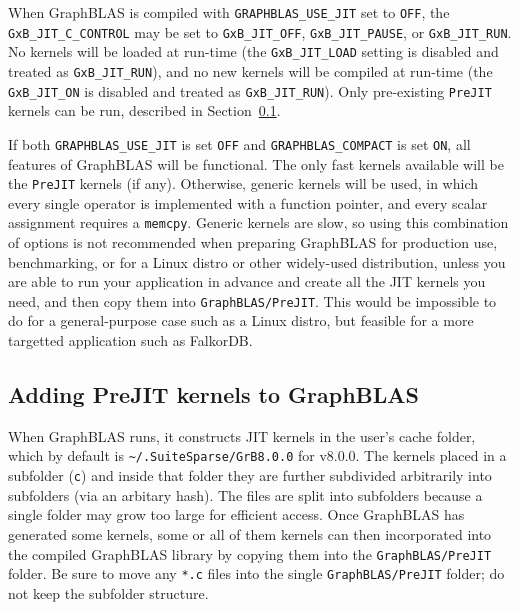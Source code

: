 \documentclass[12pt]{article}
\begin{document}
When GraphBLAS is compiled with \verb'GRAPHBLAS_USE_JIT' set to \verb'OFF', the
\verb'GxB_JIT_C_CONTROL' may be set to \verb'GxB_JIT_OFF',
\verb'GxB_JIT_PAUSE', or \verb'GxB_JIT_RUN'.  No kernels will be loaded at
run-time (the \verb'GxB_JIT_LOAD' setting is disabled and treated as
\verb'GxB_JIT_RUN'), and no new kernels will be compiled at run-time (the
\verb'GxB_JIT_ON' is disabled and treated as \verb'GxB_JIT_RUN').  Only
pre-existing \verb'PreJIT' kernels can be run, described in
Section~\ref{prejit}.

If both \verb'GRAPHBLAS_USE_JIT' is set \verb'OFF' and
\verb'GRAPHBLAS_COMPACT' is set \verb'ON', all features of GraphBLAS will be
functional.  The only fast kernels available will be the \verb'PreJIT' kernels
(if any).  Otherwise, generic kernels will be used, in which every single
operator is implemented with a function pointer, and every scalar assignment
requires a \verb'memcpy'.  Generic kernels are slow, so using this combination
of options is not recommended when preparing GraphBLAS for production use,
benchmarking, or for a Linux distro or other widely-used distribution, unless
you are able to run your application in advance and create all the JIT kernels
you need, and then copy them into \verb'GraphBLAS/PreJIT'.  This would be
impossible to do for a general-purpose case such as a Linux distro, but
feasible for a more targetted application such as FalkorDB.

\subsection{Adding {\sf PreJIT} kernels to GraphBLAS}
\label{prejit}

When GraphBLAS runs, it constructs JIT kernels in the user's cache folder,
which by default is \verb'~/.SuiteSparse/GrB8.0.0' for v8.0.0.  The
kernels placed in a subfolder (\verb'c') and inside that folder they are
further subdivided arbitrarily into subfolders (via an arbitary hash).  The
files are split into subfolders because a single folder may grow too large for
efficient access.  Once GraphBLAS has generated some kernels, some or all of
them kernels can then incorporated into the compiled GraphBLAS library by
copying them into the \verb'GraphBLAS/PreJIT' folder.  Be sure to move any
\verb'*.c' files into the single \verb'GraphBLAS/PreJIT' folder; do not keep
the subfolder structure.
\end{document}
